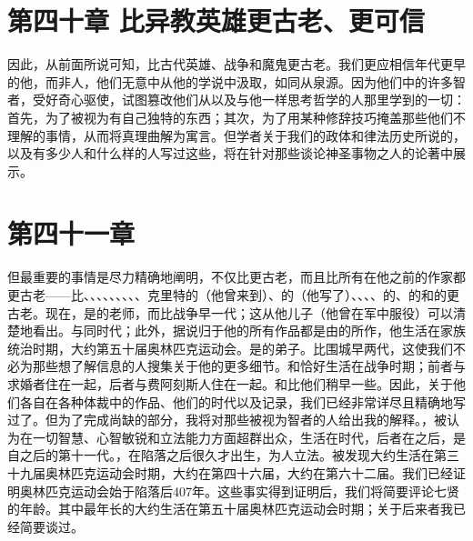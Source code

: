 
\section{第四十章 比异教英雄更古老、更可信}

因此，从前面所说可知，比古代英雄、战争和魔鬼更古老。我们更应相信年代更早的他，而非人，他们无意中从他的学说中汲取，如同从泉源。因为他们中的许多智者，受好奇心驱使，试图篡改他们从以及与他一样思考哲学的人那里学到的一切：首先，为了被视为有自己独特的东西；其次，为了用某种修辞技巧掩盖那些他们不理解的事情，从而将真理曲解为寓言。但学者关于我们的政体和律法历史所说的，以及有多少人和什么样的人写过这些，将在针对那些谈论神圣事物之人的论著中展示。\par


\section{第四十一章}

但最重要的事情是尽力精确地阐明，不仅比更古老，而且比所有在他之前的作家都更古老——比、、、、、、、、、克里特的（他曾来到）、的（他写了）、、、、的、的和的更古老。现在，是的老师，而比战争早一代；这从他儿子（他曾在军中服役）可以清楚地看出。与同时代；此外，据说归于他的所有作品都是由的所作，他生活在家族统治时期，大约第五十届奥林匹克运动会。是的弟子。比围城早两代，这使我们不必为那些想了解信息的人搜集关于他的更多细节。和恰好生活在战争时期；前者与求婚者住在一起，后者与费阿刻斯人住在一起。和比他们稍早一些。因此，关于他们各自在各种体裁中的作品、他们的时代以及记录，我们已经非常详尽且精确地写过了。但为了完成尚缺的部分，我将对那些被视为智者的人给出我的解释。，被认为在一切智慧、心智敏锐和立法能力方面超群出众，生活在时代，后者在之后，是自之后的第十一代。，在陷落之后很久才出生，为人立法。被发现大约生活在第三十九届奥林匹克运动会时期，大约在第四十六届，大约在第六十二届。我们已经证明奥林匹克运动会始于陷落后407年。这些事实得到证明后，我们将简要评论七贤的年龄。其中最年长的大约生活在第五十届奥林匹克运动会时期；关于后来者我已经简要谈过。\par

